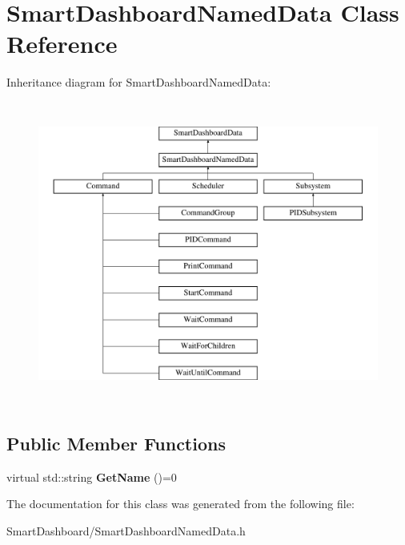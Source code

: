 \hypertarget{classSmartDashboardNamedData}{
\section{SmartDashboardNamedData Class Reference}
\label{classSmartDashboardNamedData}
}
Inheritance diagram for SmartDashboardNamedData:\begin{figure}[H]
\begin{center}
\leavevmode
\includegraphics[height=10.000000cm]{classSmartDashboardNamedData}
\end{center}
\end{figure}
\subsection*{Public Member Functions}
\begin{DoxyCompactItemize}
\item 
\hypertarget{classSmartDashboardNamedData_ac656d8434c3fc4985e0f49d55bf949bc}{
virtual std::string {\bfseries GetName} ()=0}
\label{classSmartDashboardNamedData_ac656d8434c3fc4985e0f49d55bf949bc}

\end{DoxyCompactItemize}


The documentation for this class was generated from the following file:\begin{DoxyCompactItemize}
\item 
SmartDashboard/SmartDashboardNamedData.h\end{DoxyCompactItemize}
